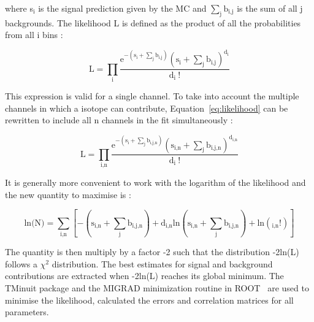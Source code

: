 \documentclass[main.tex]{subfiles}
\begin{document}
\bigskip


\NI where s$_\text{i}$ is the signal prediction given by the MC and $\sum_\text{j} \text{b}_{\text{i,j}}$ is the sum of all j backgrounds. The likelihood L is defined as the product of all the probabilities from all i bins : 


\begin{equation}\label{eq:likelihood}
\text{L} = \prod_\text{i} \frac {\text{e}^{-(\text{s}_\text{i}+\sum_\text{j} \text{b}_{\text{i,j}})} (\text{s}_\text{i} + \sum_\text{j} \text{b}_{\text{i,j}} )^{\text{d}_\text{i}} } {\text{d}_\text{i}~\text{!}}
\end{equation}


\bigskip


\NI This expression is valid for a single channel. To take into account the multiple channels in which a isotope can contribute, Equation~\ref{eq:likelihood} can be rewritten to include all n channels in the fit simultaneously : 


\begin{equation}
\text{L} = \prod_{\text{i,n}} \frac{\text{e}^{-(\text{s}_\text{i}+ \sum_\text{j} \text{b}_{\text{i,j,n}})} (\text{s}_{\text{i,n}} + \sum _\text{j} \text{b}_{\text{i,j,n}})^{\text{d}_{\text{i,n}}} } {\text{d}_\text{i}~\text{!}}
\end{equation}


\bigskip


\NI It is generally more convenient to work with the logarithm of the likelihood and the new quantity to maximise is :


\begin{equation}
\text{ln(N)} = \sum_{\text{i,n}} \left[ -(\text{s}_{\text{i,n}} + \sum_\text{j} \text{b}_{\text{i,j,n}}) + \text{d}_{\text{i,n}} \text{ln} \left( \text{s}_{\text{i,n}} + \sum_\text{j} \text{b}_{\text{i,j,n}}\right) + \text{ln}(\text{}_{\text{i,n}} \text{!})  \right]
\end{equation}


\bigskip


\NI The quantity is then multiply by a factor -2 such that the distribution -2ln(L) follows a $\chi^\text{2}$ distribution. The best estimates for signal and background contributions are extracted when -2ln(L) reaches its global minimum. The TMinuit package and the MIGRAD minimization routine in ROOT~\cite{Root} are used to minimise the likelihood, calculated the errors and correlation matrices for all parameters.



\bigskip
\end{document}
